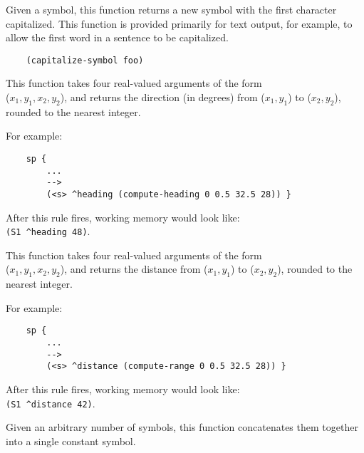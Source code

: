 \begin{description}
	
\item [\soarb{capitalize-symbol} --- ] 
	Given a symbol, this function returns a new symbol with the first character capitalized. This function is provided primarily for text output, for example, to allow the first word in a sentence to be capitalized.


	\begin{verbatim}
	(capitalize-symbol foo)
	\end{verbatim}


\item [\soarb{compute-heading} --- ] 
	This function takes four real-valued arguments of the form \\
	($x_1, y_1, x_2, y_2$), and returns the direction (in degrees) from ($x_1, y_1$) to ($x_2, y_2$), rounded to the nearest integer.

	For example:
	
	\begin{verbatim}
	sp {
	    ...
	    -->
	    (<s> ^heading (compute-heading 0 0.5 32.5 28)) }
	\end{verbatim}
	
	After this rule fires, working memory would look like: \\
	\verb|(S1 ^heading 48)|.


\item [\soarb{compute-range} --- ] 
	This function takes four real-valued arguments of the form \\
	($x_1, y_1, x_2, y_2$), and returns the distance from ($x_1, y_1$) to ($x_2, y_2$), rounded to the nearest integer.

	For example:
	
	\begin{verbatim}
	sp {
	    ...
	    -->
	    (<s> ^distance (compute-range 0 0.5 32.5 28)) }
	\end{verbatim}
	
	After this rule fires, working memory would look like: \\
	\verb|(S1 ^distance 42)|.


\item [\soarb{concat} --- ] 
	Given an arbitrary number of symbols, this function concatenates them together into a single constant symbol. 


\end{description}
